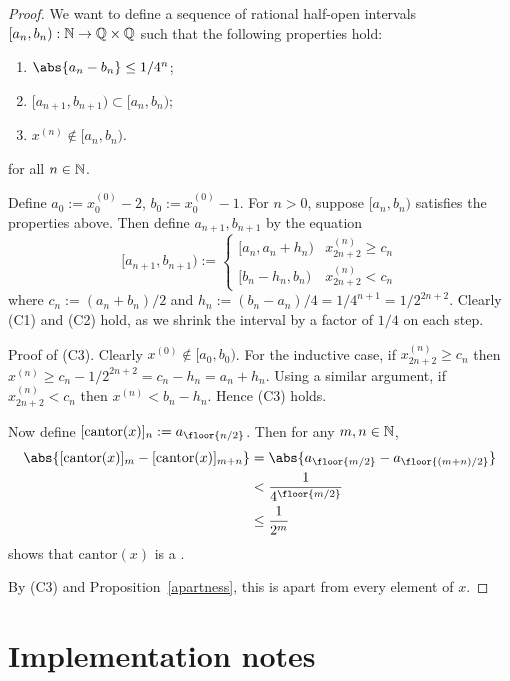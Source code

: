 \documentclass[leqno]{report}
\begin{document}
\begin{proof}
    We want to define a sequence of rational half-open intervals $[a_n, b_n) : \mathbb{N} \rightarrow \mathbb{Q} \times \mathbb{Q}$ such that the following properties hold:
    \begin{enumerate}[label=(C\arabic*)]
        \item $\abs{a_n - b_n} \leq 1/4^n$;
        \item $[a_{n+1}, b_{n+1}) \subset [a_n, b_n)$;
        \item $x^{(n)} \notin [a_n, b_n)$.
    \end{enumerate}
    for all $n \in \mathbb{N}$.

    Define $a_0 := x^{(0)}_0 - 2$, $b_0 := x^{(0)}_0 - 1$.
    For $n > 0$, suppose $[a_n, b_n)$ satisfies the properties above. Then define $a_{n+1}, b_{n+1}$ by the equation
    \[
        [a_{n+1}, b_{n+1}) := \begin{cases}
            [a_n, a_n + h_n) & x^{(n)}_{2n+2} \geq c_n \\
            [b_n - h_n, b_n) & x^{(n)}_{2n+2} < c_n
        \end{cases}
    \]
    where $c_n := (a_n + b_n) / 2$ and $h_n := (b_n - a_n) / 4 = 1/4^{n+1} = 1/2^{2n+2}$. Clearly (C1) and (C2) hold, as we shrink the interval by a factor of $1/4$ on each step.

    Proof of (C3). Clearly $x^{(0)} \notin [a_0, b_0)$. For the inductive case, if $x^{(n)}_{2n+2} \geq c_n$ then $x^{(n)} \geq c_n - 1/2^{2n+2} = c_n - h_n = a_n + h_n$. Using a similar argument, if $x^{(n)}_{2n+2} < c_n$ then $x^{(n)} < b_n - h_n$. Hence (C3) holds.

    Now define $[\mathrm{cantor}(x)]_n := a_{\floor{n/2}}$. Then for any $m, n \in \mathbb{N}$,
    \begin{align*}
        \abs{[\mathrm{cantor}(x)]_m - [\mathrm{cantor}(x)]_{m+n}}
        &= \abs{a_{\floor{m/2}} - a_{\floor{(m+n)/2}}} \\
        &< \frac{1}{4^{\floor{m/2}}} \\
        &\leq \frac{1}{2^m}
    \end{align*}
    shows that $\mathrm{cantor}(x)$ is a \FCCS.

    By (C3) and Proposition~\ref{apartness}, this is apart from every element of $x$.
\end{proof}

\chapter{Implementation notes}
\end{document}
